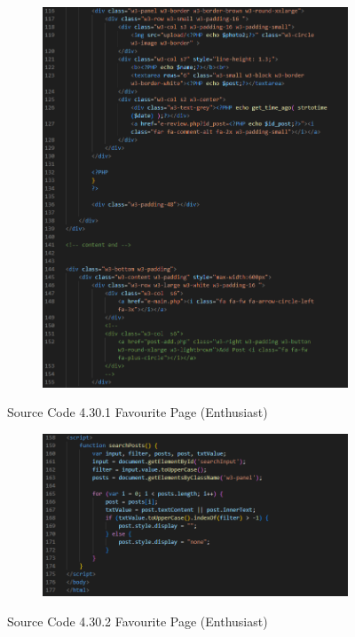 \begin{enumerate}[1.]
\begin{figure}[h]
        \begin{subfigure}[b]{0.6\textwidth}
            \centering
            \includegraphics[width=\textwidth]{mainmatter/images/frontend/code/efav2.png}
            \label{fig:sub2}
        \end{subfigure}
        \caption*{Source Code 4.30.1 Favourite Page (Enthusiast)}
        \label{fig:myfig69a}
    \end{figure}
    \begin{figure}[h]\ContinuedFloat
        \centering
        \begin{subfigure}[b]{0.7\textwidth}
            \centering
            \includegraphics[width=\textwidth]{mainmatter/images/frontend/code/efav3.png}
            \label{fig:sub3}
        \end{subfigure}
        \caption*{Source Code 4.30.2 Favourite Page (Enthusiast)}
        \label{fig:myfig69b}
    \end{figure}


\end{enumerate}
